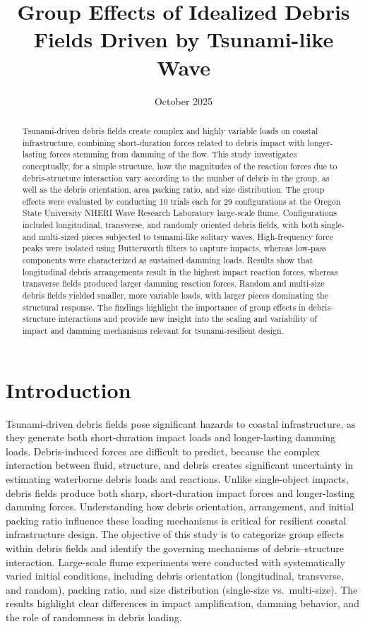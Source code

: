 \documentclass{article}
\title{Group Effects of Idealized Debris Fields Driven by Tsunami-like Wave}
\date{October 2025}
\begin{document}
\maketitle
\begin{abstract}
Tsunami-driven debris fields create complex and highly variable loads on coastal infrastructure, combining short-duration forces related to debris impact with longer-lasting forces stemming from damming of the flow. This study investigates conceptually, for a simple structure, how the magnitudes of the reaction forces due to debris-structure interaction vary according to the number of debris in the group, as well as the debris orientation, area packing ratio, and size distribution. The group effects were evaluated by conducting 10 trials each for 29 configurations at the Oregon State University NHERI Wave Research Laboratory large-scale flume. Configurations included longitudinal, transverse, and randomly oriented debris fields, with both single- and multi-sized pieces subjected to tsunami-like solitary waves. High-frequency force peaks were isolated using Butterworth filters to capture impacts, whereas low-pass components were characterized as sustained damming loads. Results show that longitudinal debris arrangements result in the highest impact reaction forces, whereas transverse fields produced larger damming reaction forces. Random and multi-size debris fields yielded smaller, more variable loads, with larger pieces dominating the structural response. The findings highlight the importance of group effects in debris–structure interactions and provide new insight into the scaling and variability of impact and damming mechanisms relevant for tsunami-resilient design.
\end{abstract}

\section{Introduction}
Tsunami-driven debris fields pose significant hazards to coastal infrastructure, as they generate both short-duration impact loads and longer-lasting damming loads. Debris-induced forces are difficult to predict, because the complex interaction between fluid, structure, and debris creates significant uncertainty in estimating waterborne debris loads and reactions. Unlike single-object impacts, debris fields produce both sharp, short-duration impact forces and longer-lasting damming forces. Understanding how debris orientation, arrangement, and initial packing ratio influence these loading mechanisms is critical for resilient coastal infrastructure design. The objective of this study is to categorize group effects within debris fields and identify the governing mechanisms of debris–structure interaction. Large-scale flume experiments were conducted with systematically varied initial conditions, including debris orientation (longitudinal, transverse, and random), packing ratio, and size distribution (single-size vs.\ multi-size). The results highlight clear differences in impact amplification, damming behavior, and the role of randomness in debris loading.
\end{document}
